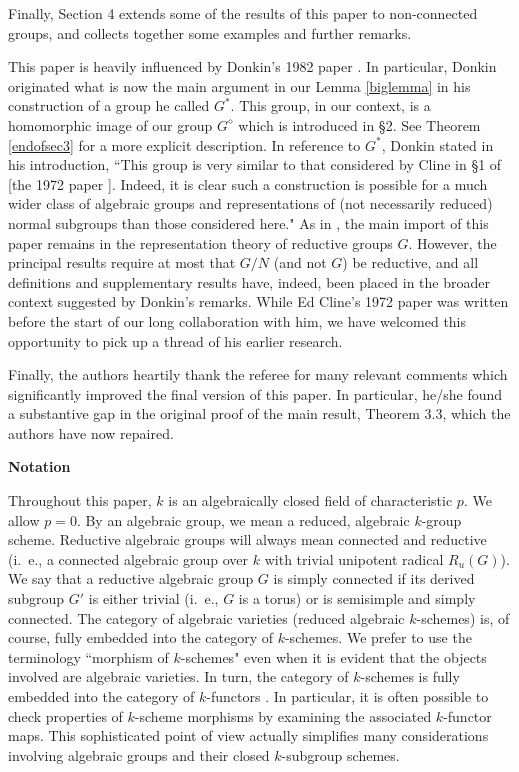 \documentclass[11pt,leqno,amscd,amssymb,verbatim, url]{amsart}
\theoremstyle{definition}
\numberwithin{equation}{thm}
\begin{document}
   Finally, Section 4 extends some of the results of this paper to non-connected groups, and collects together some examples and further remarks.

This paper is heavily influenced by Donkin's 1982 paper \cite{Donkin1}. In particular, Donkin originated  what is now the
main argument in our Lemma \ref{biglemma} in his construction of a group he called $G^*$. This group, in our context, is a homomorphic
image of our group $G^\diamond$ which is introduced in \S2. See Theorem \ref{endofsec3} for
a more explicit description. In reference to $G^*$, Donkin stated in his introduction,
``This group is very similar to that considered by Cline in \S1 of [the 1972 paper \cite{Cline}]. Indeed, it is clear
such a construction is possible for a much wider class of algebraic groups and representations of (not necessarily
reduced) normal subgroups than those considered here." As in \cite{Donkin1}, the main import of this paper remains in
the representation theory of reductive groups $G$. However, the principal results
require at most that $G/N$ (and not $G$) be reductive, and all definitions
and supplementary results have, indeed, been placed in the broader context suggested by Donkin's remarks.
While Ed Cline's 1972 paper was written before the start of
our long collaboration with him, we have welcomed this opportunity to pick up a thread of his earlier research.

Finally, the authors heartily thank the referee for many relevant comments which significantly improved
the final version of this paper. In particular, he/she found a substantive gap in the original proof of the main result,
Theorem 3.3, which the authors have now repaired.

\medskip
\begin{center} {\bf{Notation}}\end{center}
\medskip

 Throughout this paper, $k$ is an algebraically closed field of characteristic
$p$. We allow $p=0$.  By an algebraic group, we mean a reduced, algebraic $k$-group scheme. Reductive algebraic groups will always mean connected and reductive (i.~e., a connected algebraic group over $k$ with trivial unipotent radical $R_u(G)$). We say that a reductive algebraic
group $G$ is simply connected if its derived subgroup $G'$ is either trivial (i.~e., $G$ is a torus) or is
semisimple and simply connected. The category of algebraic varieties (reduced algebraic $k$-schemes) is, of course,
fully embedded into the category of $k$-schemes. We prefer to use the terminology ``morphism of $k$-schemes" even when it is evident
that the objects involved are algebraic varieties.  In turn, the category of $k$-schemes is fully embedded into the category of
$k$-functors \cite{DG}. In particular, it is often possible to check properties of $k$-scheme morphisms by examining the associated
$k$-functor maps. This sophisticated point of view actually simplifies many considerations involving algebraic groups and
 their closed $k$-subgroup schemes.
\end{document}
